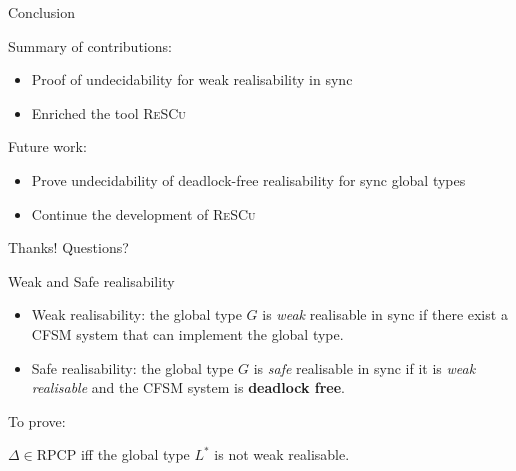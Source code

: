 \documentclass{beamer}
\begin{document}


\begin{frame}[fragile]{Conclusion}

	Summary of contributions:
	\begin{itemize}
		\item Proof of undecidability for weak realisability in sync
		\item Enriched the tool \textsc{ReSCu} 
	\end{itemize}

	\bigskip

	Future work:
	\begin{itemize}
		\item Prove undecidability of deadlock-free realisability for sync global types
		\item Continue the development of \textsc{ReSCu}
	\end{itemize}

	\bigskip

	\begin{center}
		\Large Thanks! Questions?
	\end{center}
\end{frame}

\begin{frame}{Weak and Safe realisability}
  \begin{itemize}
    \item 
    Weak realisability: the global type $G$ is \emph{weak} realisable in sync if 
    there exist a CFSM system that can implement the global type.

    \bigskip

    \item 
    Safe realisability: the global type $G$ is \emph{safe} realisable in sync if 
    it is \emph{weak realisable} and the CFSM system is \textbf{deadlock free}.

  \end{itemize}

  \bigskip

  \bigskip

  To prove:
  \begin{center}
		$\Delta \in \text{RPCP}$ iff the global type $L^*$ is not weak realisable.
	\end{center}
\end{frame}
\end{document}
